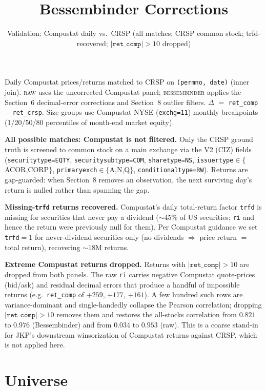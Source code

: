 \documentclass[11pt]{article}
\title{\textbf{Bessembinder Corrections}}
\author{}
\date{Validation: Compustat daily vs.\ CRSP (all matches; CRSP common stock; trfd-recovered; $|\texttt{ret\_comp}|>10$ dropped)}
\begin{document}
\maketitle

\noindent
Daily Compustat prices/returns matched to CRSP on \texttt{(permno, date)}
(inner join). \textsc{raw} uses the uncorrected Compustat panel;
\textsc{bessembinder} applies the Section~6 decimal-error corrections and
Section~8 outlier filters. $\Delta$ $=$ \texttt{ret\_comp} $-$
\texttt{ret\_crsp}. Size groups use Compustat NYSE (\texttt{exchg=11}) monthly
breakpoints (1/20/50/80 percentiles of month-end market equity).

\medskip
\noindent
\textbf{All possible matches: Compustat is not filtered.} Only the CRSP ground
truth is screened to common stock on a main exchange via the V2 (CIZ) fields
(\texttt{securitytype=EQTY}, \texttt{securitysubtype=COM}, \texttt{sharetype=NS},
\texttt{issuertype}$\in\{$ACOR,CORP$\}$, \texttt{primaryexch}$\in\{$A,N,Q$\}$,
\texttt{conditionaltype=RW}). Returns are gap-guarded: when Section~8 removes an
observation, the next surviving day's return is nulled rather than spanning the
gap.

\medskip
\noindent
\textbf{Missing-\texttt{trfd} returns recovered.} Compustat's daily total-return
factor \texttt{trfd} is missing for securities that never pay a dividend
($\sim$45\% of US securities; \texttt{ri} and hence the return were previously
null for them). Per Compustat guidance we set \texttt{trfd}$=1$ for
never-dividend securities only (no dividends $\Rightarrow$ price return $=$ total
return), recovering $\sim$18M returns.

\medskip
\noindent
\textbf{Extreme Compustat returns dropped.} Returns with
$|\texttt{ret\_comp}|>10$ are dropped from both panels. The raw \texttt{ri}
carries negative Compustat quote-prices (bid/ask) and residual decimal errors
that produce a handful of impossible returns (e.g.\ \texttt{ret\_comp} of
$+259$, $+177$, $+161$). A few hundred such rows are variance-dominant and
single-handedly collapse the Pearson correlation; dropping
$|\texttt{ret\_comp}|>10$ removes them and restores the all-stocks correlation
from $0.821$ to $0.976$ (Bessembinder) and from $0.034$ to $0.953$ (raw). This
is a coarse stand-in for JKP's downstream winsorization of Compustat returns
against CRSP, which is not applied here.

\section*{Universe}
\end{document}
